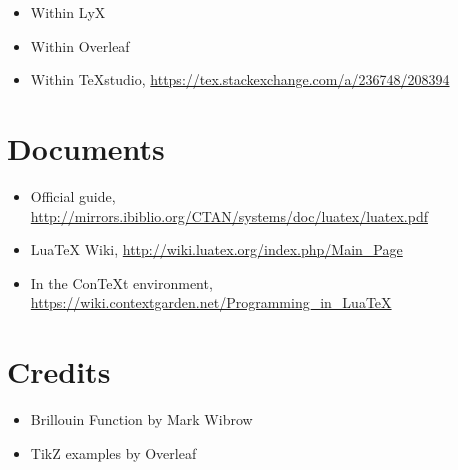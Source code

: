 \documentclass[a4paper]{article}
\begin{document}
\begin{itemize}
    \item Within LyX
    \item Within Overleaf
    \item Within TeXstudio, \url{https://tex.stackexchange.com/a/236748/208394}
\end{itemize}

\section{Documents}
\begin{itemize}
    \item Official guide, \url{http://mirrors.ibiblio.org/CTAN/systems/doc/luatex/luatex.pdf}
    \item LuaTeX Wiki, \url{http://wiki.luatex.org/index.php/Main_Page}
    \item In the ConTeXt environment, \url{https://wiki.contextgarden.net/Programming_in_LuaTeX}
\end{itemize}

\section{Credits}
\begin{itemize}
    \item Brillouin Function by Mark Wibrow
    \item TikZ examples by Overleaf
\end{itemize}
\end{document}
